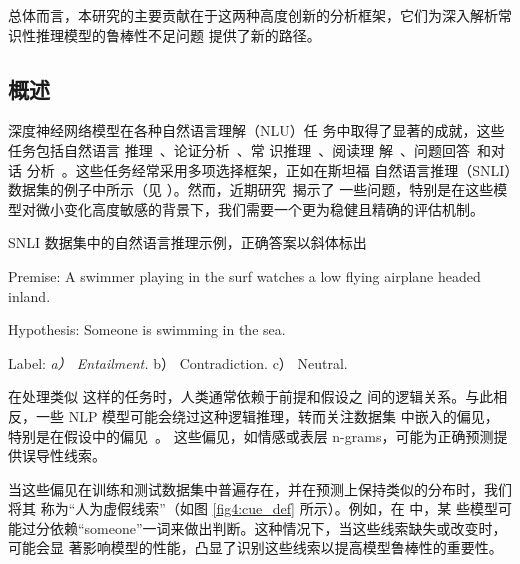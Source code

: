 总体而言，本研究的主要贡献在于这两种高度创新的分析框架，它们为深入解析常识性推理模型的鲁棒性不足问题
提供了新的路径。

\subsection{概述}
\label{sec4:intro}
深度神经网络模型在各种自然语言理解（NLU）任
务中取得了显著的成就，这些任务包括自然语言
推理~\cite{bowman2015large,wang2018glue}、论证分析~\cite{niven2019probing}、常
识推理~\cite{mostafazadeh2016corpus,roemmele2011choice,zellers2018swag}、阅读理
解~\cite{lai2017race}、问题回答~\cite{talmor2019commonsenseqa}和对话
分析~\cite{lowe2015ubuntu}。这些任务经常采用多项选择框架，正如在斯坦福
自然语言推理（SNLI）数据集的例子中所示（见 ）。然而，近期研究~\cite{gururangan2018annotation,sanchez2018behavior,poliak2018hypothesis,checklist2020acl}揭示了
一些问题，特别是在这些模型对微小变化高度敏感的背景下，我们需要一个更为稳健且精确的评估机制。

\begin{center}
    \begin{example}\label{exp4:snli}
    SNLI 数据集中的自然语言推理示例，正确答案以斜体标出
    \begin{description}
    \item{Premise:} A swimmer playing in the surf watches a low flying airplane headed inland.
    \item{Hypothesis:} Someone is swimming in the sea.
    \item{Label:} \textit{a） Entailment.} b） Contradiction. c） Neutral.
    \end{description}
    \end{example}
    \end{center}
在处理类似  这样的任务时，人类通常依赖于前提和假设之
间的逻辑关系。与此相反，一些 NLP 模型可能会绕过这种逻辑推理，转而关注数据集
中嵌入的偏见，特别是在假设中的偏见~\cite{naik2018stress,schuster2019towards}。
这些偏见，如情感或表层 n-grams，可能为正确预测提供误导性线索。

当这些偏见在训练和测试数据集中普遍存在，并在预测上保持类似的分布时，我们将其
称为``人为虚假线索''（如图 \ref{fig4:cue_def} 所示）。例如，在  中，某
些模型可能过分依赖``someone''一词来做出判断。这种情况下，当这些线索缺失或改变时，可能会显
著影响模型的性能，凸显了识别这些线索以提高模型鲁棒性的重要性。

